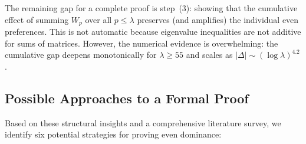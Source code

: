\documentclass[12pt,a4paper]{article}
\theoremstyle{definition}
\theoremstyle{remark}
\begin{document}
\noindent The remaining gap for a complete proof is step~(3): showing that the cumulative effect of summing $W_p$ over all $p \leq \lambda$ preserves (and amplifies) the individual even preferences. This is not automatic because eigenvalue inequalities are not additive for sums of matrices. However, the numerical evidence is overwhelming: the cumulative gap deepens monotonically for $\lambda \geq 55$ and scales as $|\Delta| \sim (\log\lambda)^{4.2}$.

\subsection{Possible Approaches to a Formal Proof}

Based on these structural insights and a comprehensive literature survey, we identify six potential strategies for proving even dominance:
\end{document}

